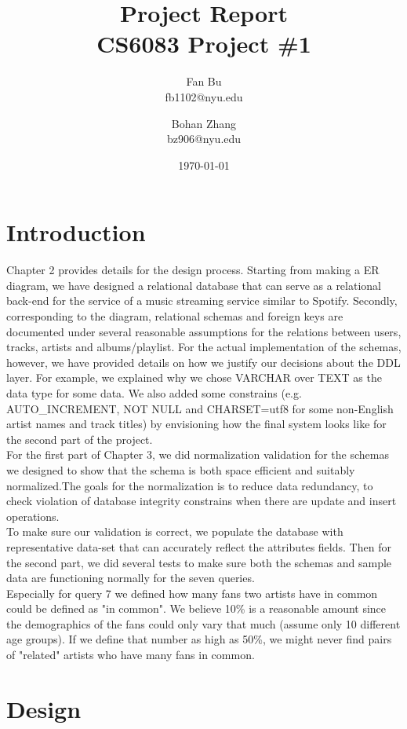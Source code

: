 \documentclass[letterpaper, 12pt]{report}
\title{
	{Project Report}\\
	{\large CS6083 Project \#1}}
\author{Fan Bu \\ fb1102@nyu.edu \and Bohan Zhang \\ bz906@nyu.edu}
\date{\today}
\begin{document}
	\maketitle
	
	\tableofcontents
	
	\chapter{Introduction}
	
	Chapter 2 provides details for the design process. Starting from making a ER diagram, we have designed a relational database that can serve as a relational back-end for the service of a music streaming service similar to Spotify. Secondly, corresponding to the diagram, relational schemas and foreign keys are documented under several reasonable assumptions for the relations between users, tracks, artists and albums/playlist. For the actual implementation of the schemas, however, we have provided details on how we justify our decisions about the DDL layer. For example, we explained why we chose VARCHAR over TEXT as the data type for some data. We also added some constrains (e.g. AUTO\_INCREMENT, NOT NULL and CHARSET=utf8 for some non-English artist names and track titles) by envisioning how the final system looks like for the second part of the project.\\   
	For the first part of Chapter 3, we did normalization validation for the schemas we designed to show that the schema is both space efficient and suitably normalized.The goals for the normalization is to reduce data redundancy, to check violation of database integrity constrains when there are update and insert operations.\\
	To make sure our validation is correct, we populate the database with representative data-set that can accurately reflect the attributes fields.
    Then for the second part, we did several tests to make sure both the schemas and sample data are functioning normally for the seven queries.\\ 
    Especially for query 7 we defined how many fans two artists have in common could be defined as "in common". We believe 10\% is a reasonable amount since the demographics of the fans could only vary that much (assume only 10 different age groups). If we define that number as high as 50\%, we might never find pairs of "related" artists who have many fans in common. 
	
	
	\chapter{Design}
\end{document}
